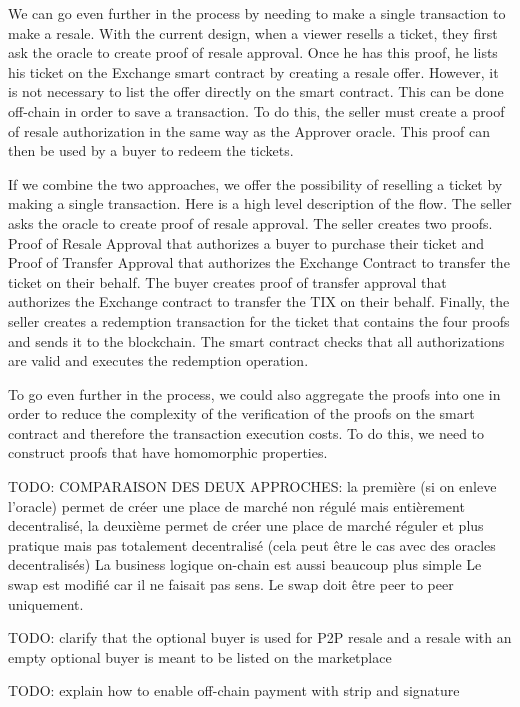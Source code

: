 \documentclass[a4paper,11pt,oneside]{report}
\begin{document}
We can go even further in the process by needing to make a single transaction to make a resale. With the current design, when a viewer resells a ticket, they first ask the oracle to create proof of resale approval. Once he has this proof, he lists his ticket on the Exchange smart contract by creating a resale offer. However, it is not necessary to list the offer directly on the smart contract. This can be done off-chain in order to save a transaction. To do this, the seller must create a proof of resale authorization in the same way as the Approver oracle. This proof can then be used by a buyer to redeem the tickets.

If we combine the two approaches, we offer the possibility of reselling a ticket by making a single transaction. Here is a high level description of the flow. The seller asks the oracle to create proof of resale approval. The seller creates two proofs. Proof of Resale Approval that authorizes a buyer to purchase their ticket and Proof of Transfer Approval that authorizes the Exchange Contract to transfer the ticket on their behalf. The buyer creates proof of transfer approval that authorizes the Exchange contract to transfer the TIX on their behalf. Finally, the seller creates a redemption transaction for the ticket that contains the four proofs and sends it to the blockchain. The smart contract checks that all authorizations are valid and executes the redemption operation.

To go even further in the process, we could also aggregate the proofs into one in order to reduce the complexity of the verification of the proofs on the smart contract and therefore the transaction execution costs. To do this, we need to construct proofs that have homomorphic properties.


TODO: COMPARAISON DES DEUX APPROCHES: la première (si on enleve l'oracle) permet de créer une place de marché non régulé mais entièrement decentralisé, la deuxième permet de créer une place de marché réguler et plus pratique mais pas totalement decentralisé (cela peut être le cas avec des oracles decentralisés)
La business logique on-chain est aussi beaucoup plus simple
Le swap est modifié car il ne faisait pas sens. Le swap doit être peer to peer uniquement.

TODO: clarify that the optional buyer is used for P2P resale and a resale with an empty optional buyer is meant to be listed on the marketplace

TODO: explain how to enable off-chain payment with strip and signature
\end{document}
